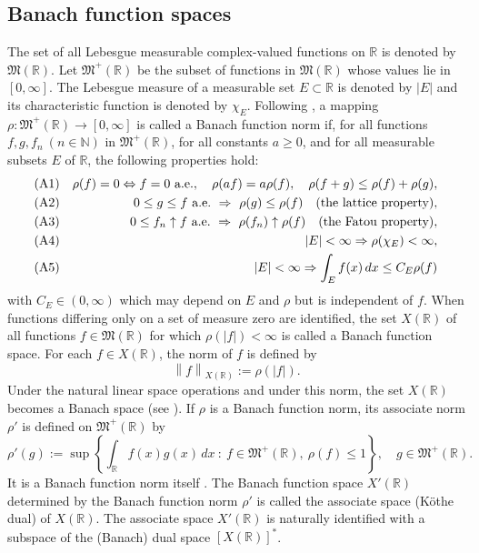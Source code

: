 \documentclass{birkjour}
\numberwithin{equation}{section}
\newcommand{\N}{\mathbb{N}}
\newcommand{\R}{\mathbb{R}}
\newcommand{\fM}{\mathfrak{M}}
\begin{document}
\subsection{Banach function spaces}\label{sec:BFS}
The set of all Lebesgue measurable complex-valued functions on $\R$ is denoted
by $\fM(\R)$. Let $\fM^+(\R)$ be the subset of functions in $\fM(\R)$ whose
values lie  in $[0,\infty]$. The Lebesgue measure of a measurable set
$E\subset\R$ is denoted by $|E|$ and its characteristic function is denoted
by $\chi_E$. Following \cite[Chap.~1, Definition~1.1]{BS88}, a mapping
$\rho:\fM^+(\R)\to [0,\infty]$ is called a Banach function norm if,
for all functions $f,g, f_n \ (n\in\N)$ in $\fM^+(\R)$, for all
constants $a\ge 0$, and for all measurable subsets $E$ of $\R$, the following
properties hold:
\begin{eqnarray*}
{\rm (A1)} & & \rho(f)=0  \Leftrightarrow  f=0\ \mbox{a.e.}, \quad
\rho(af)=a\rho(f), \quad
\rho(f+g) \le \rho(f)+\rho(g),\\
{\rm (A2)} & &0\le g \le f \ \mbox{a.e.} \ \Rightarrow \ \rho(g)
\le \rho(f)
\quad\mbox{(the lattice property)},
\\
{\rm (A3)} & &0\le f_n \uparrow f \ \mbox{a.e.} \ \Rightarrow \
       \rho(f_n) \uparrow \rho(f)\quad\mbox{(the Fatou property)},\\
{\rm (A4)} & & |E|<\infty \Rightarrow \rho(\chi_E) <\infty,\\
{\rm (A5)} & & |E|<\infty \Rightarrow \int_E f(x)\,dx \le C_E\rho(f)
\end{eqnarray*}
with $C_E \in (0,\infty)$ which may depend on $E$ and $\rho$ but is
independent of $f$. When functions differing only on a set of measure zero
are identified, the set $X(\R)$ of all functions $f\in\fM(\R)$
for which $\rho(|f|)<\infty$ is called a Banach function space. For each
$f\in X(\R)$,
the norm of $f$ is defined by
\[
\left\|f\right\|_{X(\R)} :=\rho(|f|).
\]
Under the natural linear space operations and under this norm, the set
$X(\R)$ becomes a Banach space (see \cite[Chap.~1, Theorems~1.4 and~1.6]{BS88}).
If $\rho$ is a Banach function norm, its associate norm $\rho'$ is
defined on $\fM^+(\R)$ by
\[
\rho'(g):=\sup\left\{
\int_{\R} f(x)g(x)\,dx \ : \ f\in \fM^+(\R), \ \rho(f) \le 1
\right\}, \quad g\in \fM^+(\R).
\]
It is a Banach function norm itself \cite[Chap.~1, Theorem~2.2]{BS88}.
The Banach function space $X'(\R)$ determined by the Banach function norm
$\rho'$ is called the associate space (K\"othe dual) of $X(\R)$.
The associate space $X'(\R)$ is naturally identified with a subspace
of the (Banach) dual space $[X(\R)]^*$.
\end{document}
